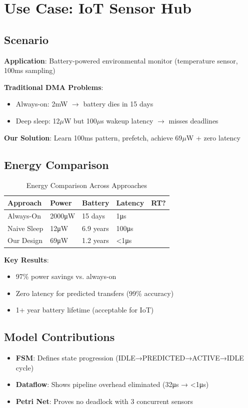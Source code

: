 \documentclass[conference]{IEEEtran}
\newcommand{\cmark}{\ding{51}}%
\newcommand{\xmark}{\ding{55}}%
\begin{document}
\section{Use Case: IoT Sensor Hub}

\subsection{Scenario}
\textbf{Application}: Battery-powered environmental monitor (temperature sensor, 100ms sampling)

\textbf{Traditional DMA Problems}:
\begin{itemize}
    \item Always-on: 2mW $\rightarrow$ battery dies in 15 days
    \item Deep sleep: 12$\mu$W but 100$\mu$s wakeup latency $\rightarrow$ misses deadlines
\end{itemize}

\textbf{Our Solution}: Learn 100ms pattern, prefetch, achieve 69$\mu$W + zero latency

\subsection{Energy Comparison}

\begin{table}[h]
\centering
\caption{Energy Comparison Across Approaches}
\label{tab:energy_comparison}
\begin{tabular}{lllll}
\toprule
\textbf{Approach} & \textbf{Power} & \textbf{Battery} & \textbf{Latency} & \textbf{RT?} \\
\midrule
Always-On & 2000μW & 15 days & 1μs & \cmark \\
Naive Sleep & 12μW & 6.9 years & 100μs & \xmark \\
Our Design & 69μW & 1.2 years & <1μs & \cmark\cmark \\
\bottomrule
\end{tabular}
\end{table}

\textbf{Key Results}:
\begin{itemize}
    \item 97\% power savings vs. always-on
    \item Zero latency for predicted transfers (99\% accuracy)
    \item 1+ year battery lifetime (acceptable for IoT)
\end{itemize}

\subsection{Model Contributions}
\begin{itemize}
    \item \textbf{FSM}: Defines state progression (IDLE→PREDICTED→ACTIVE→IDLE cycle)
    \item \textbf{Dataflow}: Shows pipeline overhead eliminated (32μs → <1μs)
    \item \textbf{Petri Net}: Proves no deadlock with 3 concurrent sensors
\end{itemize}
\end{document}
